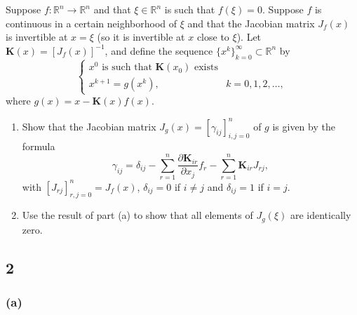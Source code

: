 \documentclass{article}
\begin{document}
\section{}
Suppose $f: \mathbb{R}^n \to \mathbb{R}^n$ and that $\xi \in \mathbb{R}^n$ is such that $f(\xi )=0$. Suppose $f$ is continuous in a certain neighborhood of $\xi$ and that the Jacobian matrix $J_f(x)$ is invertible at $x=\xi$ (so it is invertible at $x$ close to $\xi$). Let $\textbf{K}(x)=[J_f(x)]^{-1}$, and define the sequence $\bigg\{x^k \bigg\}_{k=0}^{\infty} \subset \mathbb{R}^n$ by
\begin{equation*}
    \begin{cases}
    x^0 \text{ is such that }\textbf{K}(x_0) \text{ exists}\\
    x^{k+1}=g(x^k), & k=0,1,2,\dots ,
    \end{cases}
\end{equation*}
where $g(x) = x-\textbf{K}(x)f(x)$.
\begin{enumerate}[label = (\alph*)]
    \item Show that the Jacobian matrix $J_g(x)=[\gamma_{ij}]_{i,j=0}^n$ of $g$ is given by the formula
    \begin{equation*}
        \gamma_{ij} = \delta_{ij} - \sum_{r=1}^n \frac{\partial \textbf{K}_{ir}}{\partial x_j}f_r - \sum_{r=1}^n \textbf{K}_{ir}J_{rj},
    \end{equation*}
    with $[J_{rj}]_{r,j=0}^n = J_f(x)$, $\delta_{ij} = 0$ if $i \ne j$ and $\delta_{ij}=1$ if $i=j$.
    \item Use the result of part (a) to show that all elements of $J_g(\xi)$ are identically zero.
\end{enumerate}
\subsection*{2}
\subsubsection*{(a)}
\end{document}
